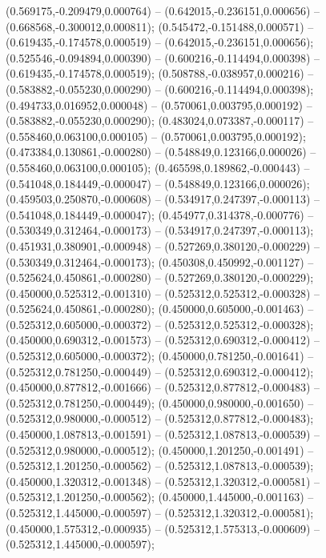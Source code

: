  (0.569175,-0.209479,0.000764) -- (0.642015,-0.236151,0.000656) -- (0.668568,-0.300012,0.000811);
 (0.545472,-0.151488,0.000571) -- (0.619435,-0.174578,0.000519) -- (0.642015,-0.236151,0.000656);
 (0.525546,-0.094894,0.000390) -- (0.600216,-0.114494,0.000398) -- (0.619435,-0.174578,0.000519);
 (0.508788,-0.038957,0.000216) -- (0.583882,-0.055230,0.000290) -- (0.600216,-0.114494,0.000398);
 (0.494733,0.016952,0.000048) -- (0.570061,0.003795,0.000192) -- (0.583882,-0.055230,0.000290);
 (0.483024,0.073387,-0.000117) -- (0.558460,0.063100,0.000105) -- (0.570061,0.003795,0.000192);
 (0.473384,0.130861,-0.000280) -- (0.548849,0.123166,0.000026) -- (0.558460,0.063100,0.000105);
 (0.465598,0.189862,-0.000443) -- (0.541048,0.184449,-0.000047) -- (0.548849,0.123166,0.000026);
 (0.459503,0.250870,-0.000608) -- (0.534917,0.247397,-0.000113) -- (0.541048,0.184449,-0.000047);
 (0.454977,0.314378,-0.000776) -- (0.530349,0.312464,-0.000173) -- (0.534917,0.247397,-0.000113);
 (0.451931,0.380901,-0.000948) -- (0.527269,0.380120,-0.000229) -- (0.530349,0.312464,-0.000173);
 (0.450308,0.450992,-0.001127) -- (0.525624,0.450861,-0.000280) -- (0.527269,0.380120,-0.000229);
 (0.450000,0.525312,-0.001310) -- (0.525312,0.525312,-0.000328) -- (0.525624,0.450861,-0.000280);
 (0.450000,0.605000,-0.001463) -- (0.525312,0.605000,-0.000372) -- (0.525312,0.525312,-0.000328);
 (0.450000,0.690312,-0.001573) -- (0.525312,0.690312,-0.000412) -- (0.525312,0.605000,-0.000372);
 (0.450000,0.781250,-0.001641) -- (0.525312,0.781250,-0.000449) -- (0.525312,0.690312,-0.000412);
 (0.450000,0.877812,-0.001666) -- (0.525312,0.877812,-0.000483) -- (0.525312,0.781250,-0.000449);
 (0.450000,0.980000,-0.001650) -- (0.525312,0.980000,-0.000512) -- (0.525312,0.877812,-0.000483);
 (0.450000,1.087813,-0.001591) -- (0.525312,1.087813,-0.000539) -- (0.525312,0.980000,-0.000512);
 (0.450000,1.201250,-0.001491) -- (0.525312,1.201250,-0.000562) -- (0.525312,1.087813,-0.000539);
 (0.450000,1.320312,-0.001348) -- (0.525312,1.320312,-0.000581) -- (0.525312,1.201250,-0.000562);
 (0.450000,1.445000,-0.001163) -- (0.525312,1.445000,-0.000597) -- (0.525312,1.320312,-0.000581);
 (0.450000,1.575312,-0.000935) -- (0.525312,1.575313,-0.000609) -- (0.525312,1.445000,-0.000597);
